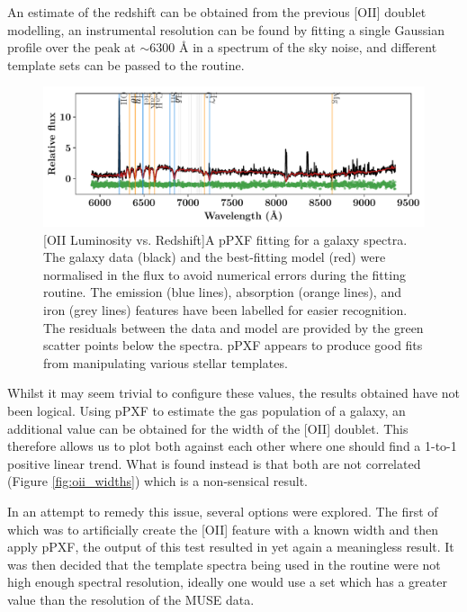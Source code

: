 \documentclass[12pt, twocolumn]{revtex4}    %
\begin{document}
An estimate of the redshift can be obtained from the previous [OII] doublet modelling, an instrumental resolution can be found by fitting a single Gaussian profile over the peak at $\sim6300$ {\AA} in a spectrum of the sky noise, and different template sets can be passed to the routine. 



\begin{figure}
\includegraphics[width=1.0\linewidth]{data/cube_1804_spectra_complete}
[OII Luminosity vs. Redshift]{A pPXF fitting for a galaxy spectra. The galaxy data (black) and  the best-fitting model (red) were normalised in the flux to avoid numerical errors during the fitting routine. The emission (blue lines), absorption (orange lines), and iron (grey lines) features have been labelled for easier recognition. The residuals between the data and model are provided by the green scatter points below the spectra. pPXF appears to produce good fits from manipulating various stellar templates.}
\label{fig:ppxf_spectra}
\end{figure}

Whilst it may seem trivial to configure these values, the results obtained have not been logical. Using pPXF to estimate the gas population of a galaxy, an additional value can be obtained for the width of the [OII] doublet. This therefore allows us to plot both against each other where one should find a 1-to-1 positive linear trend. What is found instead is that both are not correlated (Figure \ref{fig:oii_widths}) which is a non-sensical result. 

In an attempt to remedy this issue, several options were explored. The first of which was to artificially create the [OII] feature with a known width and then apply pPXF, the output of this test resulted in yet again a meaningless result. It was then decided that the template spectra being used in the routine were not high enough spectral resolution, ideally one would use a set which has a greater value than the resolution of the MUSE data. 
\end{document}
